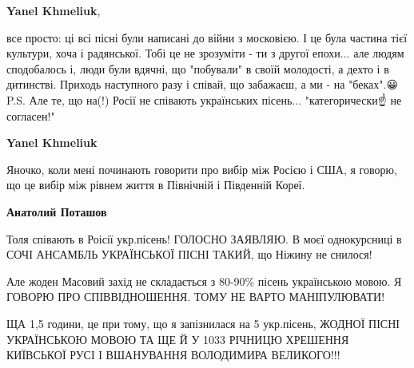 \begin{itemize}
\begin{itemize}
\begin{itemize}
 
\textbf{Yanel Khmeliuk}, 

все просто: ці всі пісні були написані до війни з московією. І це була частина
тієї культури, хоча і радянської. Тобі це не зрозуміти - ти з другої епохи...
але людям сподобалось і, люди були вдячні, що "побували" в своїй молодості, а
дехто і в дитинстві. Приходь наступного разу і співай, що забажаєш, а ми - на
"беках".😀 P.S. Але те, що на(!) Росії не співають українських пісень...
"категорически☝️ не согласен!"


 
\textbf{Yanel Khmeliuk} 

Яночко, коли мені починають говорити про вибір між Росією і США, я говорю, що
це вибір між рівнем життя в Північній і Південній Кореї.

 
\textbf{Анатолий Поташов} 

Толя співають в Роісії укр.пісень! ГОЛОСНО ЗАЯВЛЯЮ. В моєї однокурсниці в СОЧІ
АНСАМБЛЬ УКРАЇНСЬКОЇ ПІСНІ ТАКИЙ, що Ніжину не снилося!

Але жоден Масовий захід не складається з 80-90\% пісень українською мовою. Я
ГОВОРЮ ПРО СПІВВІДНОШЕННЯ. ТОМУ НЕ ВАРТО МАНІПУЛЮВАТИ!

ЩА 1,5 години, це при тому, що я запізнилася на 5 укр.пісень, ЖОДНОЇ ПІСНІ
УКРАЇНСЬКОЮ МОВОЮ ТА ЩЕ Й У 1033 РІЧНИЦЮ ХРЕШЕННЯ КИЇВСЬКОЇ РУСІ І ВШАНУВАННЯ
ВОЛОДИМИРА ВЕЛИКОГО!!!

 

\end{itemize}
\end{itemize}
\end{itemize}
